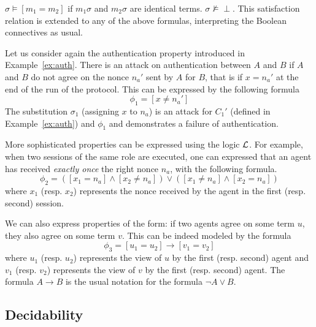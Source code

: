 \documentclass[acmtocl,acmnow]{acmtrans2m}
\newcommand{\logic}{{\cal L}}
\begin{document}
$\sigma \models [m_1=m_2]$ if $m_1\sigma$ and $m_2\sigma$ are identical terms.
$\sigma\not\models \perp$.
This satisfaction relation is extended to any of the above formulas, 
interpreting the Boolean connectives as usual.








\begin{example}
Let us consider again the authentication property introduced in
Example~\ref{ex:auth}. There is an attack on authentication between
$A$ and $B$  if $A$ and $B$ do not agree on the nonce $n_a'$ sent by
$A$ for $B$, that is if $x=n_a'$
at the end of the run of the protocol.
This can be expressed by the following formula
\[\phi_1 = [x\neq n_a']\]
The substitution $\sigma_1$ (assigning $x$ to $n_a$) is an
attack for $C_1'$ (defined in Example~\ref{ex:auth}) and $\phi_1$ and demonstrates
a failure of authentication.
\end{example}

More sophisticated properties can be expressed using the logic
$\logic$. For example, when two sessions of the same role are executed, one can
expressed that an agent has received \emph{exactly once} the right
nonce $n_a$, with the following formula.
\[\phi_2 = ([x_1=n_a]\wedge[x_2\neq n_a])\vee([x_1\neq n_a]\wedge[x_2= n_a])\]
where $x_1$ (resp. $x_2$) represents the nonce received by the agent in the
first (resp. second) session.

We can also express properties of the form: if two agents agree on
some term $u$, they also agree on some term $v$. This can be indeed
modeled by the formula
\[\phi_3 = [u_1=u_2]\rightarrow [v_1=v_2]
\]
where $u_1$ (resp. $u_2$) represents the view of $u$ by the first
(resp. second) agent and
$v_1$ (resp. $v_2$) represents the view of $v$ by the first
(resp. second) agent. The formula $A\rightarrow B$ is the usual
notation for the formula $\neg A\vee B$.


\subsection{Decidability}
\end{document}
